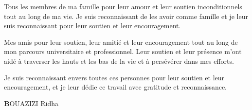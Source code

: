 Tous les membres de ma famille pour leur amour et leur soutien inconditionnels tout au long de ma vie. Je suis reconnaissant de les avoir comme famille et je leur suis reconnaissant pour leur soutien et leur encouragement. 

Mes amis pour leur soutien, leur amitié et leur encouragement tout au long de mon parcours universitaire et professionnel. Leur soutien et leur présence m'ont aidé à traverser les hauts et les bas de la vie et à persévérer dans mes efforts. 

Je suis reconnaissant envers toutes ces personnes pour leur soutien et leur encouragement, et je leur dédie ce travail avec gratitude et reconnaissance.

\begin{flushright}
\textbf BOUAZIZI Ridha
\end{flushright}